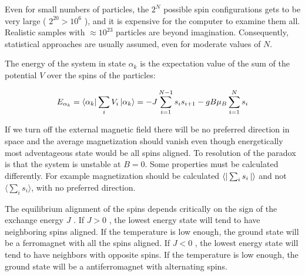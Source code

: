 \documentclass[12pt]{article}
\theoremstyle{plain}
\begin{document}
\vspace{2mm}

\par Even for small numbers of particles, the $2^N$ possible spin configurations gets to be very
large ( $2^{20} > 10^6$ ), and it is expensive for the computer to examine them all. Realistic samples
with $\approx 10^{23}$ particles are beyond imagination. Consequently, statistical approaches are usually
assumed, even for moderate values of $N$.

\vspace{2mm}

\par The energy of the system in state $\alpha_k$ is the expectation value of the sum of the potential $V$
over the spins of the particles:

\vspace{2mm}

\begin{equation}
    E_{\alpha_k} = \bra{\alpha_k}\sum_{i}V_i\ket{\alpha_k} = -J\sum_{i=1}^{N-1}s_i s_{i+1} - gB\mu_{B}\sum_{i=1}^{N}s_i
    \label{energy}
\end{equation}

\vspace{2mm}

\par If we turn off the external magnetic field there will be no preferred
direction in space and the average magnetization should vanish even though
energetically most adventageous state would be all spins aligned. To
resolution of the paradox is that the system is unstable at $B=0$. Some properties must be
calculated differently. For example magnetization should be calculated $\bra{}\sum_{i}s_{i}\ket{}$
and not $\langle \sum_{i}s_{i}\rangle$, with no preferred direction.

\vspace{2mm}

\par The equilibrium alignment of the spins depends critically on the sign of the exchange
energy $J$ . If $J > 0$ , the lowest energy state will tend to have neighboring spins aligned. If the
temperature is low enough, the ground state will be a ferromagnet with all the spins aligned.
If $J < 0$ , the lowest energy state will tend to have neighbors with opposite spins. If the
temperature is low enough, the ground state will be a antiferromagnet with alternating spins.

\vspace{2mm}
\end{document}

